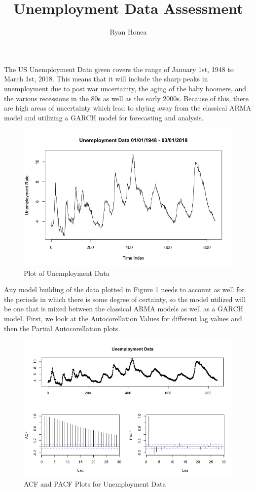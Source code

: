 \documentclass[10pt,a4paper]{article}
\author{Ryan Honea}
\title{Unemployment Data Assessment}
\begin{document}
\maketitle
The US Unemployment Data given covers the range of January 1st, 1948 to March 1st, 2018. This means that it will include the sharp peaks in unemployment due to post war uncertainty, the aging of the baby boomers, and the various recessions in the 80s as well as the early 2000s. Because of this, there are high areas of uncertainty which lead to shying away from the classical ARMA model and utilizing a GARCH model for forecasting and analysis.

\begin{figure}[h]
\centering
\includegraphics[scale=.5]{Dataplot}
\caption{Plot of Unemployment Data}
\end{figure}

Any model building of the data plotted in Figure 1 needs to account as well for the periods in which there is some degree of certainty, so the model utilized will be one that is mixed between the classical ARMA models as well as a GARCH model. First, we look at the Autocorellation Values for different lag values and then the Partial Autocorellation plots.

\begin{figure}[h]
\centering
\includegraphics[scale=.5]{TSDIsplay}
\caption{ACF and PACF Plots for Unemployment Data}
\end{figure}
\end{document}
